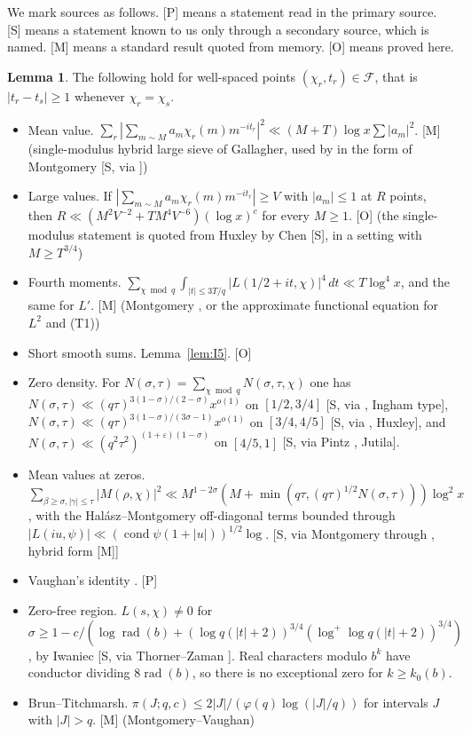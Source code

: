 \documentclass[11pt]{amsart}
\theoremstyle{definition}
\newtheorem{lemma}[theorem]{Lemma}
\numberwithin{equation}{section}
\newcommand{\cF}{\mathcal{F}}
\newcommand{\cond}{\operatorname{cond}}
\newcommand{\rad}{\operatorname{rad}}
\begin{document}
We mark sources as follows. [P] means a statement read in the primary source. [S] means a statement known to us only through a secondary source, which is named. [M] means a standard result quoted from memory. [O] means proved here.

\begin{lemma}\label{lem:tools}
The following hold for well-spaced points $(\chi_r,t_r)\in\cF$, that is $|t_r-t_s|\ge1$ whenever $\chi_r=\chi_s$.
\begin{itemize}
\item[(T1)] Mean value. $\sum_r|\sum_{m\sim M}a_m\chi_r(m)m^{-it_r}|^2\ll(M+T)\log x\sum|a_m|^2$. [M] (single-modulus hybrid large sieve of Gallagher, used by \cite{HBI} in the form of Montgomery \cite[Thm.~7.3]{Mon} [S, via \cite{HBI}])
\item[(T2)] Large values. If $|\sum_{m\sim M}a_m\chi_r(m)m^{-it_r}|\ge V$ with $|a_m|\le1$ at $R$ points, then $R\ll(M^2V^{-2}+TM^4V^{-6})(\log x)^c$ for every $M\ge1$. [O] (the single-modulus statement is quoted from Huxley \cite{Hux} by Chen \cite[\S1]{Chen} [S], in a setting with $M\ge T^{3/4}$)
\item[(T3)] Fourth moments. $\sum_{\chi\bmod q}\int_{|t|\le3T/q}|L(1/2+it,\chi)|^4\,dt\ll T\log^4x$, and the same for $L'$. [M] (Montgomery \cite[Thm.~10.1]{Mon}, or the approximate functional equation for $L^2$ and (T1))
\item[(T4)] Short smooth sums. Lemma~\ref{lem:I5}. [O]
\item[(T5)] Zero density. For $N(\sigma,\tau)=\sum_{\chi\bmod q}N(\sigma,\tau,\chi)$ one has $N(\sigma,\tau)\ll(q\tau)^{3(1-\sigma)/(2-\sigma)}x^{o(1)}$ on $[1/2,3/4]$ [S, via \cite[\S1]{Chen}, Ingham type], $N(\sigma,\tau)\ll(q\tau)^{3(1-\sigma)/(3\sigma-1)}x^{o(1)}$ on $[3/4,4/5]$ [S, via \cite[\S1]{Chen}, Huxley], and $N(\sigma,\tau)\ll(q^2\tau^2)^{(1+\varepsilon)(1-\sigma)}$ on $[4/5,1]$ [S, via Pintz \cite[eq.~(2.6)]{Pin}, Jutila].
\item[(T6)] Mean values at zeros. $\sum_{\beta\ge\sigma,|\gamma|\le\tau}|M(\rho,\chi)|^2\ll M^{1-2\sigma}(M+\min(q\tau,(q\tau)^{1/2}N(\sigma,\tau)))\log^2x$, with the Halász--Montgomery off-diagonal terms bounded through $|L(iu,\psi)|\ll(\cond\psi(1+|u|))^{1/2}\log$. [S, via Montgomery \cite[Thms.~7.3, 8.2]{Mon} through \cite{HBI}, hybrid form [M]]
\item[(T7)] Vaughan's identity \cite[Lemma~3]{HBI}. [P]
\item[(T8)] Zero-free region. $L(s,\chi)\ne0$ for $\sigma\ge1-c/(\log\rad(b)+(\log q(|t|+2))^{3/4}(\log^+\log q(|t|+2))^{3/4})$, by Iwaniec \cite{Iw74} [S, via Thorner--Zaman \cite[\S4]{TZ}]. Real characters modulo $b^k$ have conductor dividing $8\rad(b)$, so there is no exceptional zero for $k\ge k_0(b)$.
\item[(T9)] Brun--Titchmarsh. $\pi(J;q,c)\le2|J|/(\varphi(q)\log(|J|/q))$ for intervals $J$ with $|J|>q$. [M] (Montgomery--Vaughan)
\end{itemize}
\end{lemma}
\end{document}
